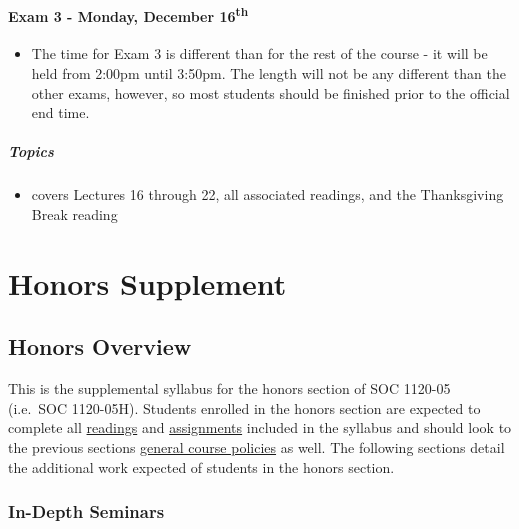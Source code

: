 \documentclass[]{book}
\providecommand{\tightlist}{%
  \setlength{\itemsep}{0pt}\setlength{\parskip}{0pt}}
\newenvironment{rmdblock}[1]
  {\begin{shaded*}
  \begin{itemize}
  \renewcommand{\labelitemi}{
    \raisebox{-.7\height}[0pt][0pt]{
      {\setkeys{Gin}{width=3em,keepaspectratio}\texttt{[image: images/\#1]}}
    }
  }
  \item
  }
  {
  \end{itemize}
  \end{shaded*}
  }
\newenvironment{rmdwarning}
  {\begin{rmdblock}{warning}}
  {\end{rmdblock}}
\begin{document}
\hypertarget{exam-3---monday-december-16th}{%
\subsection*{\texorpdfstring{Exam 3 - Monday, December 16\textsuperscript{th}}{Exam 3 - Monday, December 16th}}\label{exam-3---monday-december-16th}}

\begin{rmdwarning}
The time for Exam 3 is different than for the rest of the course - it
will be held from 2:00pm until 3:50pm. The length will not be any
different than the other exams, however, so most students should be
finished prior to the official end time.
\end{rmdwarning}

\hypertarget{topics-30}{%
\subsubsection*{Topics}\label{topics-30}}

\begin{itemize}
\tightlist
\item
  covers Lectures 16 through 22, all associated readings, and the Thanksgiving Break reading
\end{itemize}

\hypertarget{part-honors-supplement}{%
\part{Honors Supplement}\label{part-honors-supplement}}

\hypertarget{honors-overview}{%
\chapter{Honors Overview}\label{honors-overview}}

This is the supplemental syllabus for the honors section of SOC 1120-05 (i.e.~SOC 1120-05H). Students enrolled in the honors section are expected to complete all \href{/lecture-schedule.html}{readings} and \href{/assignments-and-grading.html}{assignments} included in the syllabus and should look to the previous sections \href{/course-policies.html}{general course policies} as well. The following sections detail the additional work expected of students in the honors section.

\hypertarget{in-depth-seminars}{%
\section{In-Depth Seminars}\label{in-depth-seminars}}
\end{document}
